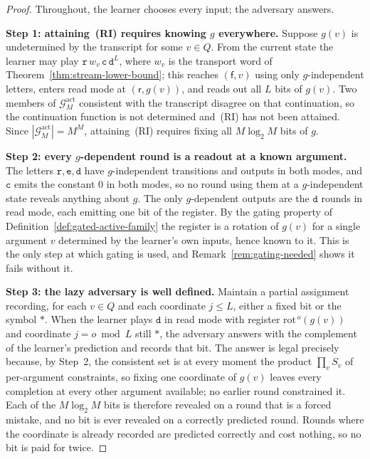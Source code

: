 \documentclass[12pt]{article}
\theoremstyle{definition}
\newcommand{\Gact}{\mathcal G^{\mathrm{act}}}
\newcommand{\free}{\mathsf f}
\newcommand{\rd}{\mathsf r}
\newcommand{\rot}{\mathrm{rot}}
\begin{document}
\begin{proof}
Throughout, the learner chooses every input; the adversary answers.

\textbf{Step 1: attaining~(RI) requires knowing $g$ everywhere.}
Suppose $g(v)$ is undetermined by the transcript for some $v\in Q$.  From the
current state the learner may play $\mathtt r\,w_v\,\mathtt c\,\mathtt d^{L}$,
where $w_v$ is the transport word of Theorem~\ref{thm:stream-lower-bound};
this reaches $(\free,v)$ using only $g$-independent letters, enters read mode
at $(\rd,g(v))$, and reads out all $L$ bits of $g(v)$.  Two members of
$\Gact_M$ consistent with the transcript disagree on that continuation, so the
continuation function is not determined and~(RI) has not been attained.  Since
$|\Gact_M|=M^M$, attaining~(RI) requires fixing all $M\log_2M$ bits of $g$.

\textbf{Step 2: every $g$-dependent round is a readout at a known argument.}
The letters $\mathtt r,\mathtt e,\mathtt d$ have $g$-independent transitions
and outputs in both modes, and $\mathtt c$ emits the constant $0$ in both
modes, so no round using them at a $g$-independent state reveals anything
about $g$.  The only $g$-dependent outputs are the $\mathtt d$ rounds in read
mode, each emitting one bit of the register.  By the gating property of
Definition~\ref{def:gated-active-family} the register is a rotation of $g(v)$
for a single argument $v$ determined by the learner's own inputs, hence known
to it.  This is the only step at which gating is used, and
Remark~\ref{rem:gating-needed} shows it fails without it.

\textbf{Step 3: the lazy adversary is well defined.}
Maintain a partial assignment recording, for each $v\in Q$ and each
coordinate $j\le L$, either a fixed bit or the symbol $\ast$.  When the learner
plays $\mathtt d$ in read mode with register $\rot^{\,o}(g(v))$ and coordinate
$j=o\bmod L$ still $\ast$, the adversary answers with the complement of the
learner's prediction and records that bit.  The answer is legal precisely
because, by Step~2, the consistent set is at every moment the product
$\prod_{v}S_v$ of per-argument constraints, so fixing one coordinate of $g(v)$
leaves every completion at every other argument available; no earlier round
constrained it.  Each of the $M\log_2M$ bits is therefore revealed on a round
that is a forced mistake, and no bit is ever revealed on a correctly predicted
round.  Rounds where the coordinate is already recorded are predicted
correctly and cost nothing, so no bit is paid for twice.


\end{proof}
\end{document}
